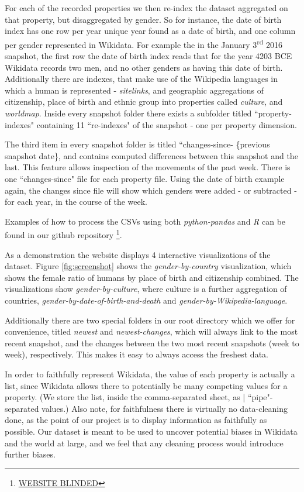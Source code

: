 \documentclass[letterpaper]{article}
\begin{document}
For each of the recorded properties we then re-index the dataset aggregated on that property, but disaggregated by gender. So for instance, the date of birth index has one row per year unique year found as a date of birth, and one column per gender represented in Wikidata. For example the in the January 3\textsuperscript{rd} 2016 snapshot, the first row the date of birth index reads that for the year 4203 BCE Wikidata records two men, and no other genders as having this date of birth. Additionally there are indexes, that make use of the Wikipedia languages in which a human is represented - \textit{sitelinks}, and geographic aggregations of citizenship, place of birth and ethnic group into properties called \textit{culture}, and \textit{worldmap}. Inside every snapshot folder there exists a subfolder titled ``property-indexes" containing 11 ``re-indexes" of the snapshot - one per property dimension.
 
 The third item in every snapshot folder is titled ``changes-since- \{previous snapshot date\}, and contains computed differences between this snapshot and the last. This feature allows inspection of the movements of the past week. There is one ``changes-since" file for each property file. Using the date of birth example again, the changes since file will show which genders were added - or subtracted - for each year, in the course of the week.

Examples of how to process the CSVs using both \textit{python-pandas} and \textit{R} can be found in our github repository \footnote{\url{WEBSITE BLINDED}}. 

As a demonstration the website displays 4 interactive visualizations of the dataset. Figure \ref{fig:screenshot} shows the \textit{gender-by-country} visualization, which shows the female ratio of humans by place of birth and citizenship combined. The visualizations show \textit{gender-by-culture}, where culture is a further aggregation of countries, \textit{gender-by-date-of-birth-and-death} and \textit{gender-by-Wikipedia-language}.

Additionally there are two special folders in our root directory which we offer for convenience,  titled \textit{newest} and \textit{newest-changes}, which will always link to the most recent snapshot, and the changes between the two most recent snapshots (week to week), respectively. This makes it easy to always access the freshest data.

In order to faithfully represent Wikidata, the value of each property is actually a list, since Wikidata allows there to potentially be many competing values for a property. (We store the list, inside the comma-separated sheet, as | ``pipe"-separated values.)  Also note, for faithfulness there is virtually no data-cleaning done, as the point of our project is to display information as faithfully as possible. Our dataset is meant to be used to uncover potential biases in Wikidata and the world at large, and we feel that any cleaning process would introduce further biases.
\end{document}
